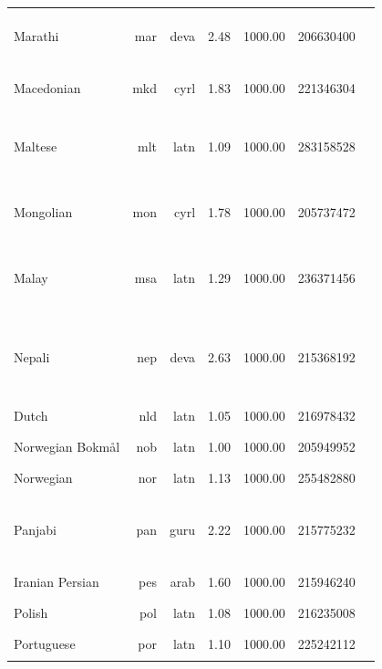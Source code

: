 \documentclass[11pt]{article}
\begin{document}
\begin{center}
\begin{longtable}[width=0.9\textwidth]{|lrrrrrl|}
Marathi & mar & deva & 2.48 & 1000.00 & 206630400 & {\color{oscar}\rule{0.45cm}{8pt}}{\color{madlad400}\rule{1.61cm}{8pt}}{\color{glot500}\rule{1.94cm}{8pt}}{\color{other}\rule{0.0cm}{8pt}} \\ 
Macedonian & mkd & cyrl & 1.83 & 1000.00 & 221346304 & {\color{oscar}\rule{1.1cm}{8pt}}{\color{glot500}\rule{2.9cm}{8pt}} \\ 
Maltese & mlt & latn & 1.09 & 1000.00 & 283158528 & {\color{oscar}\rule{0.02cm}{8pt}}{\color{nllb}\rule{0.17cm}{8pt}}{\color{glot500}\rule{3.8cm}{8pt}}{\color{other}\rule{0.010000000000000231cm}{8pt}} \\ 
Mongolian & mon & cyrl & 1.78 & 1000.00 & 205737472 & {\color{oscar}\rule{0.47cm}{8pt}}{\color{madlad400}\rule{2.54cm}{8pt}}{\color{glot500}\rule{0.9900000000000002cm}{8pt}} \\ 
Malay & msa & latn & 1.29 & 1000.00 & 236371456 & {\color{oscar}\rule{0.04cm}{8pt}}{\color{madlad400}\rule{3.31cm}{8pt}}{\color{glot500}\rule{0.44cm}{8pt}}{\color{other}\rule{0.20999999999999996cm}{8pt}} \\ 
Nepali & nep & deva & 2.63 & 1000.00 & 215368192 & {\color{oscar}\rule{0.96cm}{8pt}}{\color{nllb}\rule{0.64cm}{8pt}}{\color{madlad400}\rule{2.15cm}{8pt}}{\color{glot500}\rule{0.24cm}{8pt}}{\color{other}\rule{0.009999999999999787cm}{8pt}} \\ 
Dutch & nld & latn & 1.05 & 1000.00 & 216978432 & {\color{oscar}\rule{4.0cm}{8pt}}{\color{other}\rule{0.0cm}{8pt}} \\ 
Norwegian Bokmål & nob & latn & 1.00 & 1000.00 & 205949952 & {\color{oscar}\rule{4.0cm}{8pt}}{\color{other}\rule{0.0cm}{8pt}} \\ 
Norwegian & nor & latn & 1.13 & 1000.00 & 255482880 & {\color{glot500}\rule{4.0cm}{8pt}}{\color{other}\rule{0.0cm}{8pt}} \\ 
Panjabi & pan & guru & 2.22 & 1000.00 & 215775232 & {\color{oscar}\rule{0.23cm}{8pt}}{\color{nllb}\rule{0.46cm}{8pt}}{\color{glot500}\rule{3.21cm}{8pt}}{\color{other}\rule{0.10000000000000009cm}{8pt}} \\ 
Iranian Persian & pes & arab & 1.60 & 1000.00 & 215946240 & {\color{oscar}\rule{4.0cm}{8pt}}{\color{other}\rule{0.0cm}{8pt}} \\ 
Polish & pol & latn & 1.08 & 1000.00 & 216235008 & {\color{oscar}\rule{4.0cm}{8pt}}{\color{other}\rule{0.0cm}{8pt}} \\ 
Portuguese & por & latn & 1.10 & 1000.00 & 225242112 & {\color{oscar}\rule{4.0cm}{8pt}}{\color{other}\rule{0.0cm}{8pt}} \\ 

\end{longtable}
\end{center}
\end{document}
